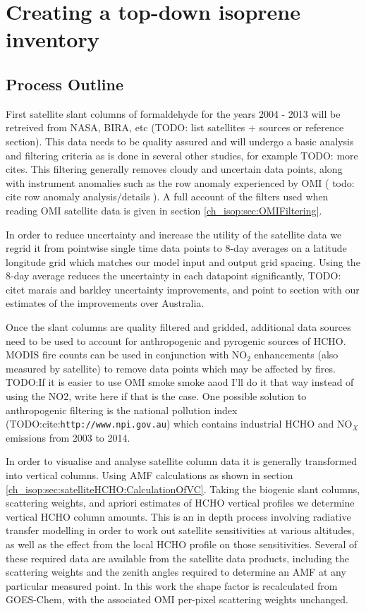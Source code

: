 \section{Creating a top-down isoprene inventory}
\label{ch_isop:sec:creatinginventory}

  \subsection{Process Outline}
    First satellite slant columns of formaldehyde for the years 2004 - 2013 will be retreived from NASA, BIRA, etc (TODO: list satellites + sources or reference section).
    This data needs to be quality assured and will undergo a basic analysis and filtering criteria as is done in several other studies, for example \citet{Marais_2012,Barkley2013, Bauwens2016, Zhu2016} TODO: more cites.
    This filtering generally removes cloudy and uncertain data points, along with instrument anomalies such as the row anomaly experienced by OMI ( todo: cite row anomaly analysis/details ).
    A full account of the filters used when reading OMI satellite data is given in section \ref{ch_isop:sec:OMIFiltering}.
    
    In order to reduce uncertainty and increase the utility of the satellite data we regrid it from pointwise single time data points to 8-day averages on a latitude longitude grid which matches our model input and output grid spacing. 
    Using the 8-day average reduces the uncertainty in each datapoint significantly, TODO: citet marais and barkley uncertainty improvements, and point to section with our estimates of the improvements over Australia.
    
    Once the slant columns are quality filtered and gridded, additional data sources need to be used to account for anthropogenic and pyrogenic sources of HCHO.
    MODIS fire counts can be used in conjunction with NO$_2$ enhancements (also measured by satellite) to remove data points which may be affected by fires. 
    TODO:If it is easier to use OMI smoke smoke aaod I'll do it that way instead of using the NO2, write here if that is the case.
    One possible solution to anthropogenic filtering is the national pollution index (TODO:cite:\verb|http://www.npi.gov.au|) which contains industrial HCHO and NO$_X$ emissions from 2003 to 2014.
    
    In order to visualise and analyse satellite column data it is generally transformed into vertical columns. 
    Using AMF calculations as shown in section \ref{ch_isop:sec:satelliteHCHO:CalculationOfVC}.
    Taking the biogenic slant columns, scattering weights, and apriori estimates of HCHO vertical profiles we determine vertical HCHO column amounts.
    This is an in depth process involving radiative transfer modelling in order to work out satellite sensitivities at various altitudes, as well as the effect from the local HCHO profile on those sensitivities.
    Several of these required data are available from the satellite data products, including the scattering weights and the zenith angles required to determine an AMF at any particular measured point.
    In this work the shape factor is recalculated from GOES-Chem, with the associated OMI per-pixel scattering weights unchanged. 
    
